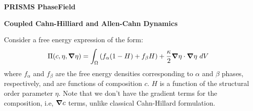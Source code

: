 \documentclass[10pt]{article}
\newcommand{\gv}[1]{\ensuremath{\mbox{\boldmath$ #1 $}}}
\newcommand{\grad}[1]{\gv{\nabla} #1}
\begin{document}
\def\Bomega{\mbox{\boldmath$\omega$}}
\def\Bvarepsilon{\mbox{\boldmath$\varepsilon$}}
\def\Bvartheta{\mbox{\boldmath$\vartheta$}}
\def\Bvarpi{\mbox{\boldmath$\varpi$}}
\def\Bvarrho{\mbox{\boldmath$\varrho$}}
\def\Bvarsigma{\mbox{\boldmath$\varsigma$}}
\def\Bvarphi{\mbox{\boldmath$\varphi$}}
\def\bone{\mathbf{1}}
\def\bzero{\mathbf{0}}
\def\bA{\mbox{\boldmath$ A$}}
\def\bB{\mbox{\boldmath$ B$}}
\def\bC{\mbox{\boldmath$ C$}}
\def\bD{\mbox{\boldmath$ D$}}
\def\bE{\mbox{\boldmath$ E$}}
\def\bF{\mbox{\boldmath$ F$}}
\def\bG{\mbox{\boldmath$ G$}}
\def\bH{\mbox{\boldmath$ H$}}
\def\bI{\mbox{\boldmath$ I$}}
\def\bJ{\mbox{\boldmath$ J$}}
\def\bK{\mbox{\boldmath$ K$}}
\def\bL{\mbox{\boldmath$ L$}}
\def\bM{\mbox{\boldmath$ M$}}
\def\bN{\mbox{\boldmath$ N$}}
\def\bO{\mbox{\boldmath$ O$}}
\def\bP{\mbox{\boldmath$ P$}}
\def\bQ{\mbox{\boldmath$ Q$}}
\def\bR{\mbox{\boldmath$ R$}}
\def\bS{\mbox{\boldmath$ S$}}
\def\bT{\mbox{\boldmath$ T$}}
\def\bU{\mbox{\boldmath$ U$}}
\def\bV{\mbox{\boldmath$ V$}}
\def\bW{\mbox{\boldmath$ W$}}
\def\bX{\mbox{\boldmath$ X$}}
\def\bY{\mbox{\boldmath$ Y$}}
\def\bZ{\mbox{\boldmath$ Z$}}
\def\ba{\mbox{\boldmath$ a$}}
\def\bb{\mbox{\boldmath$ b$}}
\def\bc{\mbox{\boldmath$ c$}}
\def\bd{\mbox{\boldmath$ d$}}
\def\be{\mbox{\boldmath$ e$}}
\def\bff{\mbox{\boldmath$ f$}}
\def\bg{\mbox{\boldmath$ g$}}
\def\bh{\mbox{\boldmath$ h$}}
\def\bi{\mbox{\boldmath$ i$}}
\def\bj{\mbox{\boldmath$ j$}}
\def\bk{\mbox{\boldmath$ k$}}
\def\bl{\mbox{\boldmath$ l$}}
\def\bm{\mbox{\boldmath$ m$}}
\def\bn{\mbox{\boldmath$ n$}}
\def\bo{\mbox{\boldmath$ o$}}
\def\bp{\mbox{\boldmath$ p$}}
\def\bq{\mbox{\boldmath$ q$}}
\def\br{\mbox{\boldmath$ r$}}
\def\bs{\mbox{\boldmath$ s$}}
\def\bt{\mbox{\boldmath$ t$}}
\def\bu{\mbox{\boldmath$ u$}}
\def\bv{\mbox{\boldmath$ v$}}
\def\bw{\mbox{\boldmath$ w$}}
\def\bx{\mbox{\boldmath$ x$}}
\def\by{\mbox{\boldmath$ y$}}
\def\bz{\mbox{\boldmath$ z$}}
\centerline{\Large{\bf PRISMS PhaseField}}
\smallskip
\centerline{\Large{\bf Coupled Cahn-Hilliard and Allen-Cahn Dynamics}}
\bigskip

Consider a free energy expression of the form:
\begin{equation}
  \Pi(c, \eta, \grad  \eta) = \int_{\Omega}    \left( f_{\alpha}(1-H) + f_{\beta}H \right)  + \frac{\kappa}{2} \grad  \eta  \cdot \grad  \eta    ~dV 
\end{equation}
where $f_{\alpha}$ and $f_{\beta}$ are the free energy densities corresponding to $\alpha$ and $\beta$ phases, respectively, and are functions of composition $c$. $H$ is a function of the structural order parameter $\eta$. Note that we don't have the gradient terms for the composition, i.e, $\grad c$ terms, unlike classical Cahn-Hillard formulation.
\end{document}

